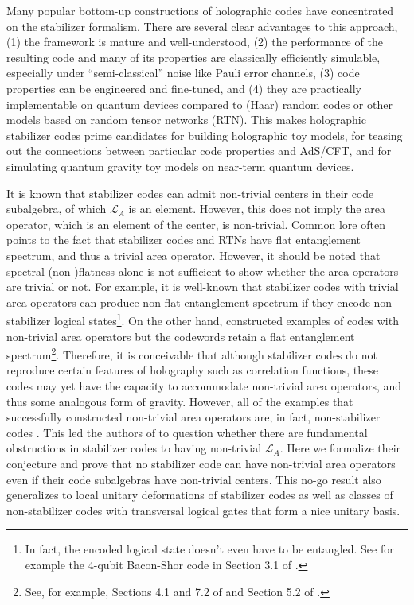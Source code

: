 \documentclass[a4paper,11pt]{article}
\theoremstyle{definition}
\numberwithin{equation}{section}
\begin{document}
Many popular bottom-up constructions of holographic codes\cite{Pastawski:2015qua,Harris:2018jfl,Jahn:2019nmz,steinberg2023holographic} have concentrated on the stabilizer formalism. There are several clear advantages to this approach, (1) the framework is mature and well-understood, (2) the performance of the resulting code and many of its properties are classically efficiently simulable, especially under ``semi-classical'' noise like Pauli error channels, (3) code properties can be engineered and fine-tuned, and (4) they are practically implementable on quantum devices compared to (Haar) random codes or other models based on random tensor networks (RTN)\cite{Hayden:2016cfa}. This makes holographic stabilizer codes prime candidates for building holographic toy models, for teasing out the connections between particular code properties and AdS/CFT, and for simulating quantum gravity toy models on near-term quantum devices. 



It is known \cite{Harlow:2016vwg,Donnelly:2016qqt,Cao:2020ksw,Pollack:2021yij} that stabilizer codes can admit non-trivial centers in their code subalgebra, of which $\mathcal{L}_A$ is an element. However, this does not imply the area operator, which is an element of the center, is non-trivial. Common lore often points to the fact that stabilizer codes and RTNs have flat entanglement spectrum, and thus a trivial area operator. However, it should be noted that spectral (non-)flatness alone is not sufficient to show whether the area operators are trivial or not. For example, it is well-known that stabilizer codes with trivial area operators can produce non-flat entanglement spectrum if they encode non-stabilizer logical states\footnote{In fact, the encoded logical state doesn't even have to be entangled. See for example the 4-qubit Bacon-Shor code in Section 3.1 of \cite{Cao:2020ksw}.}. On the other hand, \cite{Cao:2020ksw,Pollack:2021yij} constructed examples of codes with non-trivial area operators but  the codewords retain a flat entanglement spectrum\footnote{See, for example, Sections 4.1 and 7.2 of \cite{Cao:2020ksw} and Section 5.2 of \cite{Pollack:2021yij}.}. Therefore, it is conceivable that although stabilizer codes do not reproduce certain features of holography such as correlation functions, these codes may yet have the capacity to accommodate non-trivial area operators, and thus some analogous form of gravity.  However, all of the examples that successfully constructed non-trivial area operators are, in fact, non-stabilizer codes \cite{Cao:2020ksw,Pollack:2021yij}. This led the authors of \cite{Pollack:2021yij} to question whether there are fundamental obstructions in stabilizer codes to having non-trivial $\mathcal{L}_A$. Here we formalize their conjecture and prove that no stabilizer code can have non-trivial area operators even if their code subalgebras have non-trivial centers. This no-go result also generalizes to local unitary deformations of stabilizer codes as well as classes of non-stabilizer codes with transversal logical gates that form a nice unitary basis. 
\end{document}

